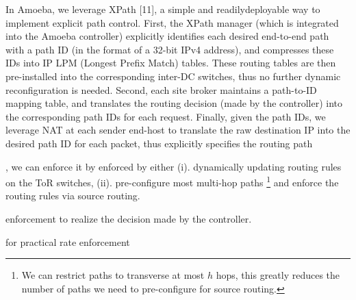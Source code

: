 {In Amoeba, we leverage XPath [11], a simple and readilydeployable
way to implement explicit path control. First,
the XPath manager (which is integrated into the Amoeba
controller) explicitly identifies each desired end-to-end path
with a path ID (in the format of a 32-bit IPv4 address), and
compresses these IDs into IP LPM (Longest Prefix Match)
tables. These routing tables are then pre-installed into the
corresponding inter-DC switches, thus no further dynamic
reconfiguration is needed. Second, each site broker maintains
a path-to-ID mapping table, and translates the routing decision
(made by the controller) into the corresponding path IDs for
each request. Finally, given the path IDs, we leverage NAT at
each sender end-host to translate the raw destination IP into
the desired path ID for each packet, thus explicitly specifies
the routing path


, we can enforce it by enforced by either (i). dynamically updating routing rules on the ToR switches, (ii). pre-configure most multi-hop paths \footnote{We can restrict paths to transverse at most $h$ hops, this greatly reduces the number of paths we need to pre-configure for source routing.} and enforce the routing rules via source routing.

enforcement to realize the decision made by the controller.

for practical rate enforcement
}

